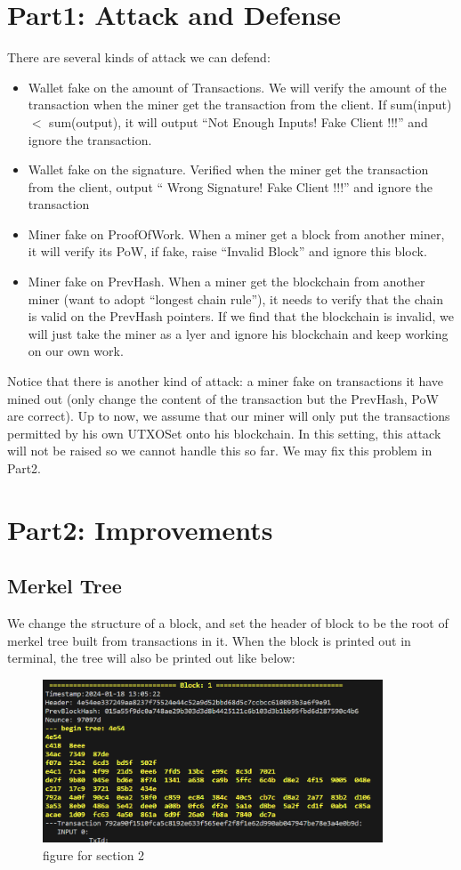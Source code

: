 \documentclass{article}
\begin{document}
\begin{spacing}{1.0}
		\section{Part1: Attack and Defense}
		There are several kinds of attack we can defend:
		\begin{itemize}
			\item Wallet fake on the amount of Transactions. We will verify the amount of the transaction when the miner get the transaction from the client. If sum(input) $<$ sum(output), it will output ``Not Enough Inputs! Fake Client !!!'' and ignore the transaction.
			\item Wallet fake on the signature. Verified when the miner get the transaction from the client, output `` Wrong Signature! Fake Client !!!'' and ignore the transaction
			\item Miner fake on ProofOfWork. When a miner get a block from another miner, it will verify its PoW, if fake, raise ``Invalid Block'' and ignore this block.
			\item Miner fake on PrevHash. When a miner get the blockchain from another miner (want to adopt ``longest chain rule''), it needs to verify that the chain is valid 
			on the PrevHash pointers. If we find that the blockchain is invalid, we will just take the miner as a lyer and ignore his blockchain and keep working on our own work.
		\end{itemize}
		Notice that there is another kind of attack: a miner fake on transactions it have mined out (only change the content of the transaction but the PrevHash, PoW are correct). Up to now, we assume that 
		our miner will only put the transactions permitted by his own UTXOSet onto his blockchain. In this setting, this attack will not be raised so we cannot handle this so far. We may fix this problem in Part2. 

		\section{Part2: Improvements}
		\subsection{Merkel Tree}
		We change the structure of a block, and set the header of block to be the root of merkel tree built from transactions in it.
		When the block is printed out in terminal, the tree will also be printed out like below:
		\begin{figure}[htbp]
			\centering
			\includegraphics[width=0.9\textwidth]{./Merkel-Tree.png}
			\caption{figure for section 2}
		\end{figure}

\end{spacing}
\end{document}
